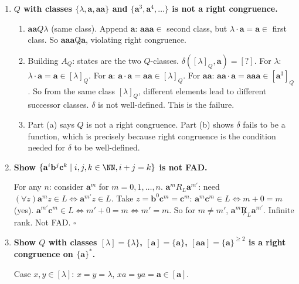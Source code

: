 \begin{enumerate}[{2.}1.]
\item \textbf{$Q$ with classes $\{\lambda,\mathbf{a},\mathbf{aa}\}$ and $\{\mathbf{a}^3,\mathbf{a}^4,\ldots\}$ is not a right congruence.}

\begin{enumerate}
\item $\mathbf{aa} Q \lambda$ (same class). Append $\mathbf{a}$: $\mathbf{aaa}\in$ second class, but $\lambda\cdot\mathbf{a}=\mathbf{a}\in$ first class. So $\mathbf{aaa}\not Q \mathbf{a}$, violating right congruence.

\item Building $A_Q$: states are the two $Q$-classes. $\delta([\lambda]_Q,\mathbf{a})=[?]$. For $\lambda$: $\lambda\cdot\mathbf{a}=\mathbf{a}\in[\lambda]_Q$. For $\mathbf{a}$: $\mathbf{a}\cdot\mathbf{a}=\mathbf{aa}\in[\lambda]_Q$. For $\mathbf{aa}$: $\mathbf{aa}\cdot\mathbf{a}=\mathbf{aaa}\in[\mathbf{a}^3]_Q$. So from the same class $[\lambda]_Q$, different elements lead to different successor classes. $\delta$ is not well-defined. This is the failure.

\item Part (a) says $Q$ is not a right congruence. Part (b) shows $\delta$ fails to be a function, which is precisely because right congruence is the condition needed for $\delta$ to be well-defined.
\end{enumerate}

\item \textbf{Show $\{\mathbf{a}^i\mathbf{b}^j\mathbf{c}^k\mid i,j,k\in\NN, i+j=k\}$ is not FAD.}

For any $n$: consider $\mathbf{a}^m$ for $m=0,1,\ldots,n$. $\mathbf{a}^m R_L \mathbf{a}^{m'}$: need $(\forall z)\mathbf{a}^mz\in L\Leftrightarrow\mathbf{a}^{m'}z\in L$. Take $z=\mathbf{b}^0\mathbf{c}^m=\mathbf{c}^m$: $\mathbf{a}^m\mathbf{c}^m\in L\Leftrightarrow m+0=m$ (yes). $\mathbf{a}^{m'}\mathbf{c}^m\in L\Leftrightarrow m'+0=m\Leftrightarrow m'=m$. So for $m\neq m'$, $\mathbf{a}^m\not R_L\mathbf{a}^{m'}$. Infinite rank. Not FAD. $\square$

\item \textbf{Show $Q$ with classes $[\lambda]=\{\lambda\}$, $[\mathbf{a}]=\{\mathbf{a}\}$, $[\mathbf{aa}]=\{\mathbf{a}\}^{\geq 2}$ is a right congruence on $\{\mathbf{a}\}^*$.}

Case $x,y\in[\lambda]$: $x=y=\lambda$, $xa=ya=\mathbf{a}\in[\mathbf{a}]$.


\end{enumerate}
